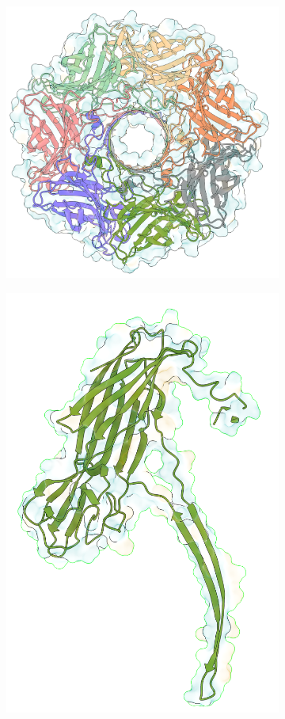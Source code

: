 \begin{figure}[ht]
\begin{centering}
  \vspace{1.cm}

  \begin{subfigure}[t]{\dimexpr.4\linewidth-1.3em\relax}
  \centering
  \includegraphics[width=\linewidth,valign=t]{Figures/ahl-top-c.png}
  \end{subfigure}
  \begin{subfigure}[t]{\dimexpr.4\linewidth-1.3em\relax}
  \centering
  \includegraphics[width=.7\linewidth,valign=t]{Figures/ahl-mon-c.png}
  \end{subfigure}


\end{centering}
\end{figure}
